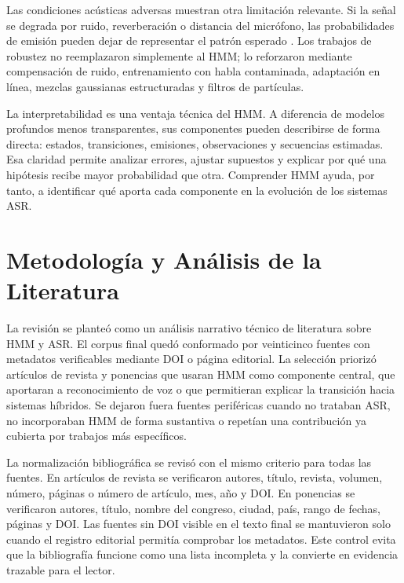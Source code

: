 Las condiciones acústicas adversas muestran otra limitación relevante. Si la señal se degrada por ruido, reverberación o distancia del micrófono, las probabilidades de emisión pueden dejar de representar el patrón esperado \cite{Vaseghi1997NoiseCompen,Matassoni2002HiddenMarkov}. Los trabajos de robustez no reemplazaron simplemente al HMM; lo reforzaron mediante compensación de ruido, entrenamiento con habla contaminada, adaptación en línea, mezclas gaussianas estructuradas y filtros de partículas.

La interpretabilidad es una ventaja técnica del HMM. A diferencia de modelos profundos menos transparentes, sus componentes pueden describirse de forma directa: estados, transiciones, emisiones, observaciones y secuencias estimadas. Esa claridad permite analizar errores, ajustar supuestos y explicar por qué una hipótesis recibe mayor probabilidad que otra. Comprender HMM ayuda, por tanto, a identificar qué aporta cada componente en la evolución de los sistemas ASR.

\section{Metodología y Análisis de la Literatura}
La revisión se planteó como un análisis narrativo técnico de literatura sobre HMM y ASR. El corpus final quedó conformado por veinticinco fuentes con metadatos verificables mediante DOI o página editorial. La selección priorizó artículos de revista y ponencias que usaran HMM como componente central, que aportaran a reconocimiento de voz o que permitieran explicar la transición hacia sistemas híbridos. Se dejaron fuera fuentes periféricas cuando no trataban ASR, no incorporaban HMM de forma sustantiva o repetían una contribución ya cubierta por trabajos más específicos.

La normalización bibliográfica se revisó con el mismo criterio para todas las fuentes. En artículos de revista se verificaron autores, título, revista, volumen, número, páginas o número de artículo, mes, año y DOI. En ponencias se verificaron autores, título, nombre del congreso, ciudad, país, rango de fechas, páginas y DOI. Las fuentes sin DOI visible en el texto final se mantuvieron solo cuando el registro editorial permitía comprobar los metadatos. Este control evita que la bibliografía funcione como una lista incompleta y la convierte en evidencia trazable para el lector.


